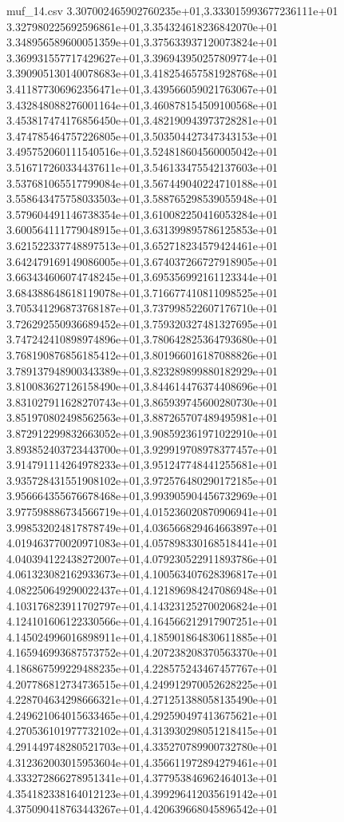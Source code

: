 \begin{filecontents*}{muf_14.csv}
3.307002465902760235e+01,3.333015993677236111e+01
3.327980225692596861e+01,3.354324618236842070e+01
3.348956589600051359e+01,3.375633937120073824e+01
3.369931557717429627e+01,3.396943950257809774e+01
3.390905130140078683e+01,3.418254657581928768e+01
3.411877306962356471e+01,3.439566059021763067e+01
3.432848088276001164e+01,3.460878154509100568e+01
3.453817474176856450e+01,3.482190943973728281e+01
3.474785464757226805e+01,3.503504427347343153e+01
3.495752060111540516e+01,3.524818604560005042e+01
3.516717260334437611e+01,3.546133475542137603e+01
3.537681065517799084e+01,3.567449040224710188e+01
3.558643475758033503e+01,3.588765298539055948e+01
3.579604491146738354e+01,3.610082250416053284e+01
3.600564111779048915e+01,3.631399895786125853e+01
3.621522337748897513e+01,3.652718234579424461e+01
3.642479169149086005e+01,3.674037266727918905e+01
3.663434606074748245e+01,3.695356992161123344e+01
3.684388648618119078e+01,3.716677410811098525e+01
3.705341296873768187e+01,3.737998522607176710e+01
3.726292550936689452e+01,3.759320327481327695e+01
3.747242410898974896e+01,3.780642825364793680e+01
3.768190876856185412e+01,3.801966016187088826e+01
3.789137948900343389e+01,3.823289899880182929e+01
3.810083627126158490e+01,3.844614476374408696e+01
3.831027911628270743e+01,3.865939745600280730e+01
3.851970802498562563e+01,3.887265707489495981e+01
3.872912299832663052e+01,3.908592361971022910e+01
3.893852403723443700e+01,3.929919708978377457e+01
3.914791114264978233e+01,3.951247748441255681e+01
3.935728431551908102e+01,3.972576480290172185e+01
3.956664355676678468e+01,3.993905904456732969e+01
3.977598886734566719e+01,4.015236020870906941e+01
3.998532024817878749e+01,4.036566829464663897e+01
4.019463770020971083e+01,4.057898330168518441e+01
4.040394122438272007e+01,4.079230522911893786e+01
4.061323082162933673e+01,4.100563407628396817e+01
4.082250649290022437e+01,4.121896984247086948e+01
4.103176823911702797e+01,4.143231252700206824e+01
4.124101606122330566e+01,4.164566212917907251e+01
4.145024996016898911e+01,4.185901864830611885e+01
4.165946993687573752e+01,4.207238208370563370e+01
4.186867599229488235e+01,4.228575243467457767e+01
4.207786812734736515e+01,4.249912970052628225e+01
4.228704634298666321e+01,4.271251388058135490e+01
4.249621064015633465e+01,4.292590497413675621e+01
4.270536101977732102e+01,4.313930298051218415e+01
4.291449748280521703e+01,4.335270789900732780e+01
4.312362003015953604e+01,4.356611972894279461e+01
4.333272866278951341e+01,4.377953846962464013e+01
4.354182338164012123e+01,4.399296412035619142e+01
4.375090418763443267e+01,4.420639668045896542e+01

\end{filecontents*}
